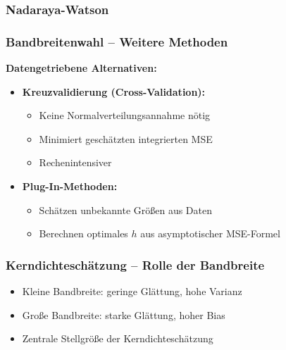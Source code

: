 \documentclass{beamer}
\begin{document}
	
	
	\begin{frame}
		\frametitle{Nadaraya-Watson}
		
		
	\end{frame}
	
	\begin{frame}
		\frametitle{Bandbreitenwahl – Weitere Methoden}
		
		\textbf{Datengetriebene Alternativen:}
		\begin{itemize}
			\item \textbf{Kreuzvalidierung (Cross-Validation):}
			\begin{itemize}
				\item Keine Normalverteilungsannahme nötig
				\item Minimiert geschätzten integrierten MSE
				\item Rechenintensiver
			\end{itemize}
			
			\item \textbf{Plug-In-Methoden:}
			\begin{itemize}
				\item Schätzen unbekannte Größen aus Daten
				\item Berechnen optimales $h$ aus asymptotischer MSE-Formel
			\end{itemize}
		\end{itemize}
	\end{frame}
	
	\begin{frame}
		\frametitle{Kerndichteschätzung – Rolle der Bandbreite}
		
		\begin{itemize}
			\item Kleine Bandbreite: geringe Glättung, hohe Varianz
			\item Große Bandbreite: starke Glättung, hoher Bias
		\end{itemize}
		
		\vspace{0.5em}
		
		\begin{itemize}
			\item Zentrale Stellgröße der Kerndichteschätzung
		\end{itemize}
	\end{frame}
	
\end{document}
